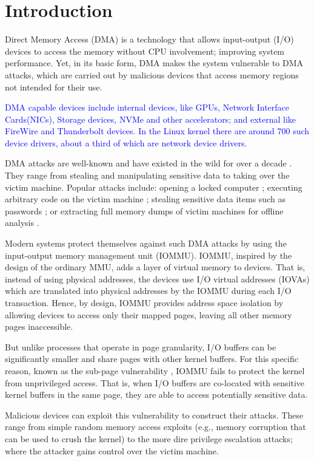 \section{Introduction}

Direct Memory Access (DMA) is a technology that allows input-output (I/O) devices to access the memory without CPU involvement; improving system performance.  
Yet, in its basic form, DMA makes the system vulnerable to DMA attacks, which are carried out by malicious devices that access memory regions not intended for their use. 

\textcolor{blue}{DMA capable devices include internal devices, like GPUs, Network Interface Cards(NICs), Storage devices, NVMe and other accelerators; and external like FireWire and Thunderbolt devices. In the Linux kernel there are around 700 such device drivers, about a third of which are network device drivers.}

DMA attacks are well-known and have existed in the wild for over a decade \cite{Dor04,BDK10,thunder}. They range from stealing and manipulating sensitive data to taking over the victim machine. Popular attacks include: opening a locked computer \cite{MM, Fin14}; executing arbitrary code on the victim machine \cite{Fri16, Woj08, AD10,thunder}; stealing sensitive data items such as passwords \cite{SB12, LKV13, Cim16, BR12}; or extracting full memory dumps of victim machines for offline analysis \cite{MM, Vol, Fin14, GA10}. 

Modern systems protect themselves against such DMA attacks by using the input-output memory management unit (IOMMU). IOMMU, inspired by the design of the ordinary MMU, adds a layer of virtual memory to devices. That is, instead of using physical addresses, the devices use I/O virtual addresses (IOVAs) which are translated into physical addresses by the IOMMU during each I/O transaction. Hence, by design, IOMMU provides address space isolation by allowing devices to access only their mapped pages, leaving all other memory pages inaccessible. 

But unlike processes that operate in page granularity, I/O buffers can be significantly smaller and share pages with other kernel buffers. For this specific reason, known as the sub-page vulnerability \cite{MMT16,thunder}, IOMMU fails to protect the kernel from unprivileged access. That is, when I/O buffers are co-located with sensitive kernel buffers in the same page, they are able to access potentially sensitive data. 

Malicious devices can exploit this vulnerability to construct their attacks. These range from simple random memory access exploits (e.g., memory corruption that can be used to crush the kernel) to the more dire privilege escalation attacks; where the attacker gains control over the victim machine.

